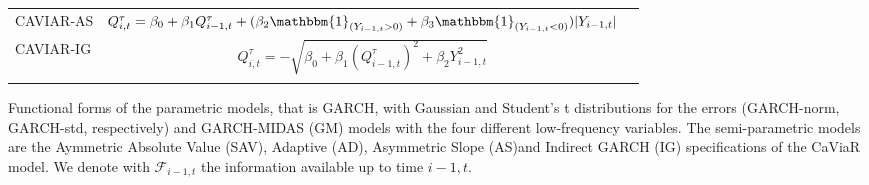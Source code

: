 \begin{table}[b]
\begin{adjustbox}{max width=2\textwidth}
\begin{threeparttable}
\begin{tabular}{l c c}
        
          CAVIAR-AS       &    $Q^{\tau}_{i,t} =  \beta_0+  \beta_1 Q^{\tau}_{i-1,t}+ (\beta_{2}\mathbbm{1}_{(Y_{i-1,t}>0)}+\beta_{3} \mathbbm{1}_{(Y_{i-1,t}<0)}) |Y_{i-1,t}|$&\\
        \addlinespace
        \hdashline
        \addlinespace
         CAVIAR-IG      &    $Q^{\tau}_{i,t} =  -\sqrt {\beta_0+ \beta_1 (Q^{\tau}_{i-1,t})^2+ \beta_2 Y_{i-1,t}^2 }$&\\ 
           \addlinespace
        \hdashline
    
        \bottomrule
      \end{tabular}
      \begin{tablenotes}[flushleft]
        \setlength{}
        \footnotesize
        \item Functional forms of the parametric models, that is GARCH,  with Gaussian and Student's t distributions for the errors (GARCH-norm, GARCH-std, respectively) and GARCH-MIDAS (GM) models with the four different low-frequency variables. The semi-parametric models are the Aymmetric Absolute Value (SAV), Adaptive (AD), Asymmetric Slope (AS)and Indirect GARCH (IG) specifications of the CaViaR model. We denote with $\mathcal{F}_{i-1,t}$ the information available up to time $i-1,t$.
      \end{tablenotes}
    \end{threeparttable}
  \end{adjustbox}
\end{table}
